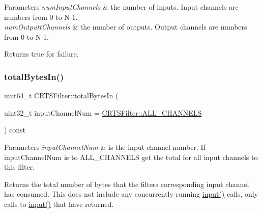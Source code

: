 \begin{DoxyParams}{Parameters}
{\em num\+Input\+Channels} & the number of inputs. Input channels are numbers from 0 to N-\/1.\\
\hline
{\em num\+Outputt\+Channels} & the number of outputs. Output channels are numbers from 0 to N-\/1.\\
\hline
\end{DoxyParams}
\begin{DoxyReturn}{Returns}
true for failure. 
\end{DoxyReturn}
\mbox{\label{classCRTSFilter_a2790e3d559443f54724a060b5abec4b7}} 
\subsubsection{\texorpdfstring{total\+Bytes\+In()}{totalBytesIn()}}
{\footnotesize\ttfamily uint64\+\_\+t C\+R\+T\+S\+Filter\+::total\+Bytes\+In (\begin{DoxyParamCaption}\item[{uint32\+\_\+t}]{input\+Channel\+Num = {\ttfamily \hyperlink{classCRTSFilter_a9ea354654e8e2e8ce3bff293cc35fafe}{C\+R\+T\+S\+Filter\+::\+A\+L\+L\+\_\+\+C\+H\+A\+N\+N\+E\+LS}} }\end{DoxyParamCaption}) const\hspace{0.3cm}{\ttfamily [protected]}}


\begin{DoxyParams}{Parameters}
{\em input\+Channel\+Num} & is the input channel number. If {\ttfamily input\+Channel\+Num} is to {\ttfamily A\+L\+L\+\_\+\+C\+H\+A\+N\+N\+E\+LS} get the total for all input channels to this filter.\\
\hline
\end{DoxyParams}
\begin{DoxyReturn}{Returns}
the total number of bytes that the filters corresponding input channel has consumed. This does not include any concurrently running \hyperlink{classCRTSFilter_ab75eb3db5914c0d6b3781439d46b2301}{input()} calls, only calls to \hyperlink{classCRTSFilter_ab75eb3db5914c0d6b3781439d46b2301}{input()} that have returned. 
\end{DoxyReturn}
\mbox{\label{classCRTSFilter_a4e67f7953354ba62d0b28fec0819abb7}} 
